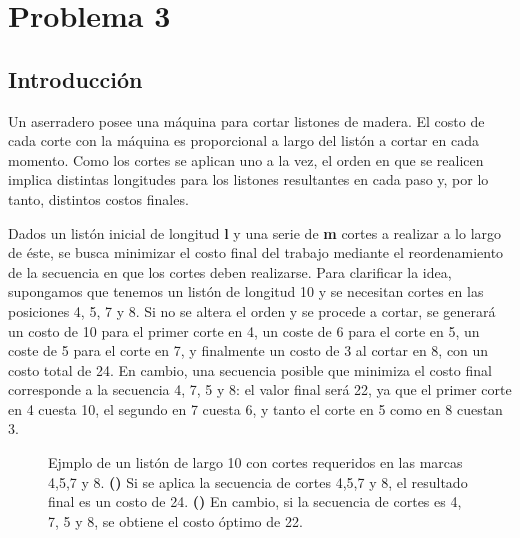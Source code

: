 \section{Problema 3}

\subsection{Introducci\'on}
Un aserradero posee una m\'aquina para cortar listones de madera. El costo de cada corte con la m\'aquina es
proporcional a largo del list\'on a cortar en cada momento. Como los cortes se aplican uno a la vez,
el orden en que se realicen implica distintas longitudes para los listones resultantes en cada paso y,
por lo tanto, distintos costos finales.

Dados un list\'on inicial de longitud \textbf{l} y una serie de \textbf{m} cortes a realizar a lo largo de \'este,
se busca minimizar el costo final del trabajo mediante el reordenamiento de la secuencia en que los cortes deben realizarse.
Para clarificar la idea, supongamos que tenemos un list\'on de longitud 10 y se necesitan cortes en las posiciones 4, 5, 7 y 8. 
Si no se altera el orden y se procede a cortar, se generar\'a un costo de 10 para el primer corte en 4, un coste de 6 para 
el corte en 5, un coste de 5 para el corte en 7, y finalmente un costo de 3 al cortar en 8, con un costo total de 24. En cambio,
una secuencia posible que minimiza el costo final corresponde a la secuencia 4, 7, 5 y 8: el valor final ser\'a 22, ya que el 
primer corte en 4 cuesta 10, el segundo en 7 cuesta 6, y tanto el corte en 5 como en 8 cuestan 3.


\begin{figure}[h!]

	\begin{subfigure}{0.5\textwidth}
			\centering
			\caption{}
			\label{fig:ej3CortesNoOptimo}
	\end{subfigure}
	\begin{subfigure}{0.5\textwidth}
			\centering
			\caption{}
			\label{fig:ej3CortesOptimo}
	\end{subfigure}
  \label{fig:ej3Cortes}
  \caption{Ejmplo de un list\'on de largo 10 con cortes requeridos en las marcas 4,5,7 y 8. 
  				\textbf{()} Si se aplica la secuencia de cortes 4,5,7 y 8, el resultado final es un costo de 24. 				
  				\textbf{()} En cambio, si la secuencia de cortes es 4, 7, 5 y 8, se obtiene el costo \'optimo de 22.}
\end{figure}
